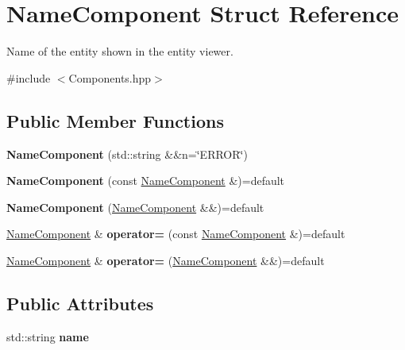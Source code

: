 \hypertarget{struct_name_component}{}\section{Name\+Component Struct Reference}
\label{struct_name_component}


Name of the entity shown in the entity viewer.  




{\ttfamily \#include $<$Components.\+hpp$>$}

\subsection*{Public Member Functions}
\begin{DoxyCompactItemize}
\item 
{\bfseries Name\+Component} (std\+::string \&\&n=\char`\"{}E\+R\+R\+OR\char`\"{})\hypertarget{struct_name_component_aa9663d779d531d990cca4d7af5ef0d21}{}\label{struct_name_component_aa9663d779d531d990cca4d7af5ef0d21}

\item 
{\bfseries Name\+Component} (const \hyperlink{struct_name_component}{Name\+Component} \&)=default\hypertarget{struct_name_component_a2c19709be0bb394ed7707c0afb37d5cd}{}\label{struct_name_component_a2c19709be0bb394ed7707c0afb37d5cd}

\item 
{\bfseries Name\+Component} (\hyperlink{struct_name_component}{Name\+Component} \&\&)=default\hypertarget{struct_name_component_a73019af387c6cc6072fab60f431fac45}{}\label{struct_name_component_a73019af387c6cc6072fab60f431fac45}

\item 
\hyperlink{struct_name_component}{Name\+Component} \& {\bfseries operator=} (const \hyperlink{struct_name_component}{Name\+Component} \&)=default\hypertarget{struct_name_component_ad3572130033eefc78ce8a95c6f154769}{}\label{struct_name_component_ad3572130033eefc78ce8a95c6f154769}

\item 
\hyperlink{struct_name_component}{Name\+Component} \& {\bfseries operator=} (\hyperlink{struct_name_component}{Name\+Component} \&\&)=default\hypertarget{struct_name_component_a19f93e7af2a6f9f599b758e92d58f01e}{}\label{struct_name_component_a19f93e7af2a6f9f599b758e92d58f01e}

\end{DoxyCompactItemize}
\subsection*{Public Attributes}
\begin{DoxyCompactItemize}
\item 
std\+::string {\bfseries name}\hypertarget{struct_name_component_a1c2d765f1636e4427afbc28b3aa049b9}{}\label{struct_name_component_a1c2d765f1636e4427afbc28b3aa049b9}

\end{DoxyCompactItemize}
